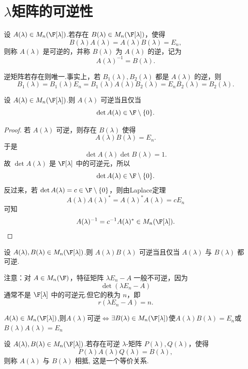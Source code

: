 \section{$\lambda$矩阵的可逆性}

\begin{definition}[可逆 $\lambda$-矩阵]\label{p1:concept:c5-l1937}
	设 $A(\lambda)\in M_n(\F[\lambda])$.若存在 $B(\lambda)\in M_n(\F[\lambda])$，使得
	\[
	B(\lambda)A(\lambda)=A(\lambda)B(\lambda)=E_n,
	\]
	则称 $A(\lambda)$ 是可逆的，并称 $B(\lambda)$ 为 $A(\lambda)$ 的逆，记为
	\[
	A(\lambda)^{-1}=B(\lambda).
	\]
\end{definition}

	逆矩阵若存在则唯一.事实上，若 $B_1(\lambda),B_2(\lambda)$ 都是 $A(\lambda)$ 的逆，则
	\[
	B_1(\lambda)=B_1(\lambda)E_n
	=B_1(\lambda)A(\lambda)B_2(\lambda)
	=E_nB_2(\lambda)=B_2(\lambda).
	\]

\begin{lemma}
	设 $A(\lambda)\in M_n(\F[\lambda])$.则 $A(\lambda)$ 可逆当且仅当
	\[
	\det A(\lambda)\in \F\setminus\{0\}.
	\]
\end{lemma}

\begin{proof}
	若 $A(\lambda)$ 可逆，则存在 $B(\lambda)$ 使得
	\[
	A(\lambda)B(\lambda)=E_n.
	\]
	于是
	\[
	\det A(\lambda)\det B(\lambda)=1.
	\]
	故 $\det A(\lambda)$ 是 $\F[\lambda]$ 中的可逆元，所以
	\[
	\det A(\lambda)\in\F\setminus\{0\}.
	\]
	反过来，若 $\det A(\lambda)=c\in\F\setminus\{0\}$，则由Laplace定理
	\[
	A(\lambda)A(\lambda)^*=A(\lambda)^*A(\lambda)=cE_n
	\]
	可知
	\[
	A(\lambda)^{-1}=c^{-1}A(\lambda)^*\in M_n(\F[\lambda]).
	\]
\end{proof}

\begin{corollary}
	设 $A(\lambda),B(\lambda)\in M_n(\F[\lambda])$.则 $A(\lambda)B(\lambda)$ 可逆当且仅当 $A(\lambda)$ 与 $B(\lambda)$ 都可逆.
\end{corollary}

注意：对 $A\in M_n(\F)$，特征矩阵 $\lambda E_n-A$ 一般不可逆，因为
\[
\det(\lambda E_n-A)
\]
通常不是 $\F[\lambda]$ 中的可逆元.但它的秩为 $n$，即
\[
r(\lambda E_n-A)=n.
\]
\begin{corollary}
	$A(\lambda)\in M_n(\F[\lambda])$,则$A(\lambda)$可逆$\iff$$\exists B(\lambda)\in M_n(\F[\lambda])$使$A(\lambda)B(\lambda)=E_n $或$B(\lambda)A(\lambda)=E_n $
\end{corollary}

\begin{definition}[相抵]\label{p1:concept:c5-l2001}
	设 $A(\lambda),B(\lambda)\in M_n(\F[\lambda])$.若存在可逆 $\lambda$-矩阵 $P(\lambda),Q(\lambda)$，使得
	\[
	P(\lambda)A(\lambda)Q(\lambda)=B(\lambda),
	\]
	则称 $A(\lambda)$ 与 $B(\lambda)$ 相抵,
	这是一个等价关系.
\end{definition}

